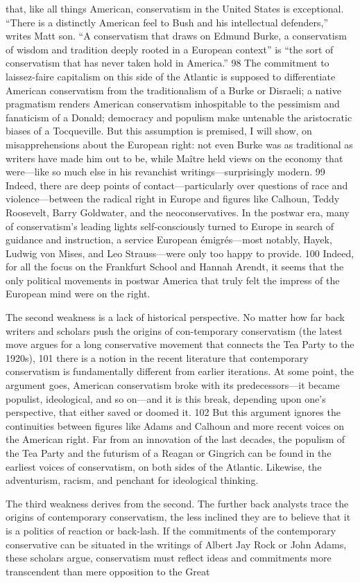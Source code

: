 that, like all things American, conservatism in the United States is exceptional. “There is a distinctly American feel to Bush and his intellectual defenders,” writes Matt son. “A conservatism that draws on Edmund Burke, a conservatism of wisdom and tradition deeply rooted in a European context” is “the sort of conservatism that has never taken hold in America.” {\color{blue} 98 } The commitment to laissez-faire capitalism on this side of the Atlantic is supposed to differentiate American conservatism from the traditionalism of a Burke or Disraeli; a native pragmatism renders American conservatism inhospitable to the pessimism and fanaticism of a Donald; democracy and populism make untenable the aristocratic biases of a Tocqueville. But this assumption is premised, I will show, on misapprehensions about the European right: not even Burke was as traditional as writers have made him out to be, while Maître held views on the economy that were—like so much else in his revanchist writings—surprisingly modern. {\color{blue} 99 } Indeed, there are deep points of contact—particularly over questions of race and violence—between the radical right in Europe and figures like Calhoun, Teddy Roosevelt, Barry Goldwater, and the neoconservatives. In the postwar era, many of conservatism’s leading lights self-consciously turned to Europe in search of guidance and instruction, a service European émigrés—most notably, Hayek, Ludwig von Mises, and Leo Strauss—were only too happy to provide. {\color{blue} 100 } Indeed, for all the focus on the Frankfurt School and Hannah Arendt, it seems that the only political movements in postwar America that truly felt the impress of the European mind were on the right.{\par} The second weakness is a lack of historical perspective. No matter how far back writers and scholars push the origins of con-temporary conservatism (the latest move argues for a long conservative movement that connects the Tea Party to the 1920s), {\color{blue} 101 } there is a notion in the recent literature that contemporary conservatism is fundamentally different from earlier iterations. At some point, the argument goes, American conservatism broke with its predecessors—it became populist, ideological, and so on—and it is this break, depending upon one’s perspective, that either saved or doomed it. {\color{blue} 102 } But this argument ignores the continuities between figures like Adams and Calhoun and more recent voices on the American right. Far from an innovation of the last decades, the populism of the Tea Party and the futurism of a Reagan or Gingrich can be found in the earliest voices of conservatism, on both sides of the Atlantic. Likewise, the adventurism, racism, and penchant for ideological thinking.{\par} The third weakness derives from the second. The further back analysts trace the origins of contemporary conservatism, the less inclined they are to believe that it is a politics of reaction or back-lash. If the commitments of the contemporary conservative can be situated in the writings of Albert Jay Rock or John Adams, these scholars argue, conservatism must reflect ideas and commitments more transcendent than mere opposition to the Great 